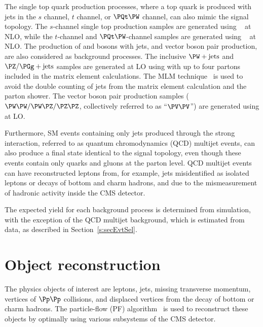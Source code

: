 The single top quark production processes, where a top quark is
produced with jets in the $s$ channel, $t$ channel, or $\PQt\PW$
channel, can also mimic the signal topology. The $s$-channel single
top production samples are generated using
\MGvATNLO~\cite{Alwall:2014hca} at NLO, while the $t$-channel and
$\PQt\PW$-channel samples are generated using
\POWHEG~\cite{Alioli:2009je,Re:2010bp} at NLO. The production of \PW
and \PZ bosons with jets, and vector boson pair production, are also
considered as background processes. The inclusive $\PW + \text{jets}$
and $\PZ/\PGg + \text{jets}$ samples are generated at LO using
\MGvATNLO with up to four partons included in the matrix element
calculations. The MLM technique~\cite{Alwall:2007fs} is used to avoid
the double counting of jets from the matrix element calculation and
the parton shower. The vector boson pair production samples
($\PW\PW/\PW\PZ/\PZ\PZ$, collectively referred to as ``$\PV\PV$'') are
generated using \PYTHIA at LO.

Furthermore, SM events containing only jets produced through the
strong interaction, referred to as quantum chromodynamics (QCD)
multijet events, can also produce a final state identical to the
signal topology, even though these events contain only quarks and 
gluons at the parton level. QCD multijet events can have reconstructed 
leptons from, for example, jets misidentified as isolated leptons or 
decays of bottom and charm hadrons, and \ptmiss due to the 
mismeasurement of hadronic activity inside the CMS detector.

The expected yield for each background process is determined from
simulation, with the exception of the QCD multijet background, which
is estimated from data, as described in Section~\ref{s:secEvtSel}.

\section{Object reconstruction}
\label{s:secReco}
The physics objects of interest are leptons, jets, missing
transverse momentum, vertices of $\Pp\Pp$ collisions, and displaced vertices
from the decay of bottom or charm hadrons. The particle-flow (PF)
algorithm~\cite{Sirunyan:2017ulk} is used to reconstruct these objects
by optimally using various subsystems of the CMS detector.

